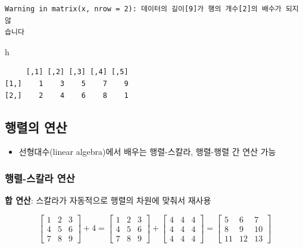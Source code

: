 \documentclass[
  11pt,
]{krantz}
\newenvironment{Shaded}{\begin{snugshade}}{\end{snugshade}}
\newcommand{\NormalTok}[1]{#1}
\providecommand{\tightlist}{%
  \setlength{\itemsep}{0pt}\setlength{\parskip}{0pt}}
\begin{document}
\begin{verbatim}
Warning in matrix(x, nrow = 2): 데이터의 길이[9]가 행의 개수[2]의 배수가 되지 않
습니다
\end{verbatim}

\begin{Shaded}
\begin{Highlighting}[]
\NormalTok{h}
\end{Highlighting}
\end{Shaded}

\begin{verbatim}
     [,1] [,2] [,3] [,4] [,5]
[1,]    1    3    5    7    9
[2,]    2    4    6    8    1
\end{verbatim}

\normalsize

\hypertarget{matrix-operation}{%
\subsection{행렬의 연산}\label{matrix-operation}}

\begin{itemize}
\tightlist
\item
  선형대수(linear algebra)에서 배우는 행렬-스칼라, 행렬-행렬 간 연산 가능
\end{itemize}

\hypertarget{mat-op-s}{%
\subsubsection*{\texorpdfstring{\textbf{행렬-스칼라 연산}}{행렬-스칼라 연산}}\label{mat-op-s}}


\textbf{합 연산}: 스칼라가 자동적으로 행렬의 차원에 맞춰서 재사용

\[\begin{bmatrix}
1 & 2 & 3 \\
4 & 5 & 6 \\ 
7 & 8 & 9
\end{bmatrix} + 4 = 
\begin{bmatrix}
1 & 2 & 3 \\
4 & 5 & 6 \\ 
7 & 8 & 9
\end{bmatrix} + 
\begin{bmatrix}
4 & 4 & 4 \\
4 & 4 & 4 \\ 
4 & 4 & 4
\end{bmatrix} = 
\begin{bmatrix}
5 &  6  & 7 \\
8 &  9  & 10 \\ 
11 & 12 & 13
\end{bmatrix}
\]
\end{document}
